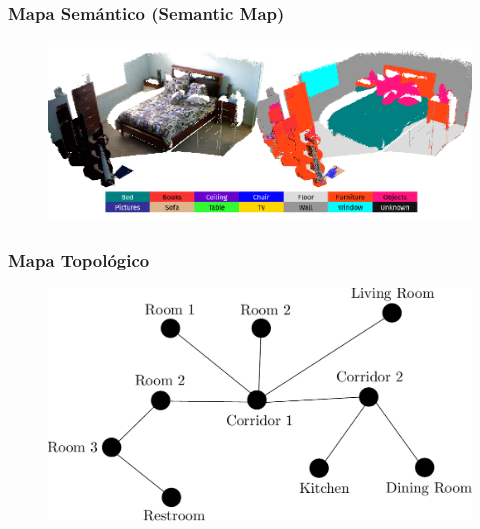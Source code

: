 \begin{frame}
	\frametitle{Mapa Semántico (Semantic Map)}
	
   	\begin{figure}
    	\includegraphics[width=0.8\columnwidth]{./images/semantic_map_semanticfusion.png}
	\end{figure}
	
\end{frame}


\begin{frame}
	\frametitle{Mapa Topológico}
	
	\begin{figure}
		\includegraphics[width=0.8\columnwidth]{./images/topological_map.pdf}
	\end{figure}
	
\end{frame}

